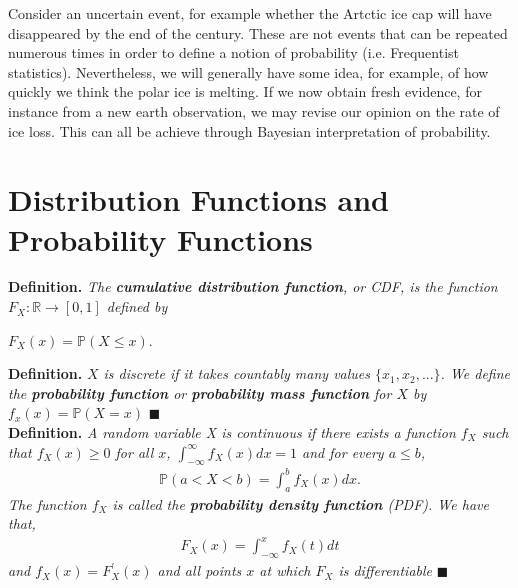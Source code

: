 \documentclass[11pt,a4paper]{report}
\begin{document}
Consider an uncertain event, for example whether the Artctic ice cap
will have disappeared by the end of the century. These are not events
that can be repeated numerous times in order to define a notion of
probability (i.e. Frequentist statistics). Nevertheless, we will
generally have some idea, for example, of how quickly we think the
polar ice is melting. If we now obtain fresh evidence, for instance
from a new earth observation, we may revise our opinion on the rate of
ice loss. This can all be achieve through Bayesian interpretation of
probability.



\section*{Distribution Functions and Probability Functions}

\noindent \textbf{Definition.} \emph{The \textbf{cumulative
    distribution function}, or CDF, is the function $F_X : \mathbb{R}
  \to [0,1]$ defined by}
\begin{center}
  $F_X(x) = \mathbb{P}(X \leq x)$.
\end{center}

\noindent \textbf{Definition.} \emph{$X$ is discrete if it takes
  countably many values $\{x_1,x_2,...\}$. We define the \textbf{probability
  function} or \textbf{probability mass function} for $X$ by $f_x(x) =
  \mathbb{P}(X = x)$} $\blacksquare$\\

\noindent \textbf{Definition.} \emph{A random variable X is continuous
if there exists a function $f_X$ such that $f_X(x) \geq 0$ for all
$x$, $\int_{-\infty}^{\infty}f_X(x)dx = 1$ and for every $a \leq b$,}
\begin{eqnarray*}
  \mathbb{P}(a < X < b) = \int_{a}^{b}f_X(x)dx.
\end{eqnarray*}
\emph{The function $f_X$ is called the \textbf{probability density
    function} (PDF). We have that,}
\begin{eqnarray*}
  F_X(x) = \int_{-\infty}^{x}f_X(t)dt
\end{eqnarray*}
\emph{and $f_X(x) = F_X^{'}(x)$ and all points $x$ at which $F_X$ is
  differentiable} $\blacksquare$\\
\end{document}
